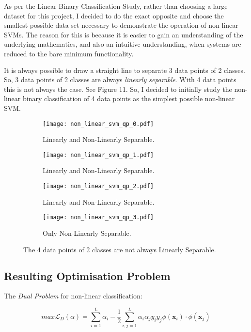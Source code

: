 \documentclass[10pt, a4paper,reqno]{amsart}
\begin{document}
As per the Linear Binary Classification Study, rather than choosing a large dataset for this project, I decided to do the exact opposite and choose the smallest possible data set necessary to demonstrate the operation of non-linear SVMs. The reason for this is because it is easier to gain an understanding of the underlying mathematics, and also an intuitive understanding, when systems are reduced to the bare minimum functionality.

It is always possible to draw a straight line to separate 3 data points of 2 classes. So, 3 data points of 2 classes are always \emph{linearly separable}. With 4 data points this is not always the case. See Figure 11. So, I decided to initially study the non-linear binary classification of 4 data points as the simplest possible non-linear SVM.

\begin{figure}[H]
	\centering	
	\begin{subfigure}{0.5\textwidth}
		\centering
		\texttt{[image: non\_linear\_svm\_qp\_0.pdf]}
		\caption{Linearly and Non-Linearly Separable.}
	\end{subfigure}%
	\begin{subfigure}{0.5\textwidth}
		\centering
		\texttt{[image: non\_linear\_svm\_qp\_1.pdf]}
		\caption{Linearly and Non-Linearly Separable.}
	\end{subfigure}
	\begin{subfigure}{0.5\textwidth}
		\centering
		\texttt{[image: non\_linear\_svm\_qp\_2.pdf]}
		\caption{Linearly and Non-Linearly Separable.}
	\end{subfigure}%
	\begin{subfigure}{0.5\textwidth}
		\centering
		\texttt{[image: non\_linear\_svm\_qp\_3.pdf]}
		\caption{Only Non-Linearly Separable.}
	\end{subfigure}
	\caption{The 4 data points of 2 classes are not always Linearly Separable.}
\end{figure}

\subsection{Resulting Optimisation Problem}

The \emph{Dual Problem} for non-linear classification:

\begin{equation}
max\mathcal{L}_D(\alpha) = \sum_{i=1}^{L}\alpha_i - \frac{1}{2}\sum_{i,j=1}^{L}\alpha_i \alpha_j y_i y_j\phi(\mathbf{x}_i)\cdot\phi(\mathbf{x}_j)
\end{equation}
\end{document}
